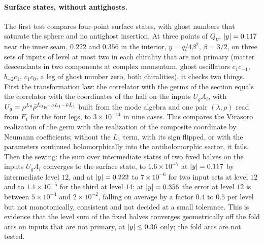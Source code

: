 \paragraph{Surface states, without antighosts.}
The first test compares four-point surface states, with ghost numbers that saturate the sphere and no antighost insertion.
At three points of $Q_V$, ${|y|} = 0.117$ near the inner seam, $0.222$ and $0.356$ in the interior, $y = q / 4 \beta^2$, $\beta = 3 / 2$, on three sets of inputs of level at most two in each chirality that are not primary (matter descendants in two components at complex momentum, ghost oscillators $c_1 c_{-1}$, $b_{-2} c_1$, $c_1 c_0$, a leg of ghost number zero, both chiralities), it checks two things.
First the transformation law: the correlator with the germs of the section equals the correlator with the coordinates of the half on the inputs $U_g A_i$, with $U_g = \rho^{L_0} \bar\rho^{\bar L_0} \mathrm{e}^{- \nu L_1 - \bar\nu \bar L_1}$ built from the mode algebra and one pair $(\lambda, \rho)$ read from $F_1$ for the four legs, to $3 \times 10^{-14}$ in nine cases.
This compares the Virasoro realization of the germ with the realization of the composite coordinate by Neumann coefficients; without the $L_1$ term, with its sign flipped, or with the parameters continued holomorphically into the antiholomorphic sector, it fails.
Then the sewing: the sum over intermediate states of two fixed halves on the inputs $U_g A_i$ converges to the surface state, to $1.6 \times 10^{-7}$ at ${|y|} = 0.117$ by intermediate level $12$, and at ${|y|} = 0.222$ to $7 \times 10^{-6}$ for two input sets at level $12$ and to $1.1 \times 10^{-5}$ for the third at level $14$; at ${|y|} = 0.356$ the error at level $12$ is between $5 \times 10^{-4}$ and $2 \times 10^{-2}$, falling on average by a factor $0.4$ to $0.5$ per level but not monotonically, consistent and not decided at a small tolerance.
This is evidence that the level sum of the fixed halves converges geometrically off the fold arcs on inputs that are not primary, at ${|y|} \leq 0.36$ only; the fold arcs are not tested.

